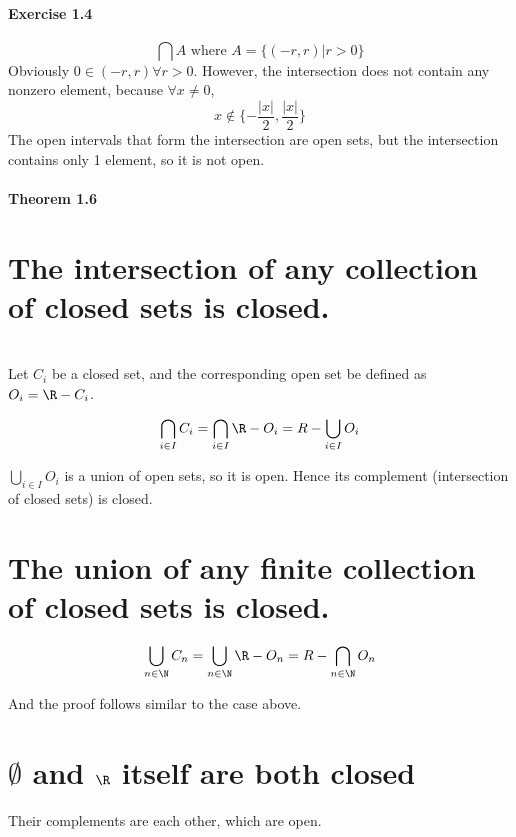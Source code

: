 \subsection{Exercise 1.4}
\setcounter{question}{0}


\begin{solution}
 $$\bigcap A \text{ where } A = \{(-r,r)|r>0\}$$
 Obviously $0 \in (-r,r) \forall r > 0$. However, the intersection does not contain any nonzero element, because $\forall x \neq 0$,
 $$x \notin \{-\frac{|x|}{2},\frac{|x|}{2}\}$$
 The open intervals that form the intersection are open sets, but the intersection contains only 1 element, so it is not open.
\end{solution}

\subsection{Theorem 1.6}
\setcounter{question}{0}

\question

\begin{parts}
 
 \part{The intersection of any collection of closed sets is closed.}
 
 
\begin{solution}
 \\Let $C_i$ be a closed set, and the corresponding open set be defined as $O_i = \R - C_i$.
 
 $$\bigcap_{i \in I} C_i = \bigcap_{i \in I} \R - O_i = R - \bigcup_{i \in I} O_i$$
 
 $\bigcup_{i\in I}O_i$ is a union of open sets, so it is open. Hence its complement (intersection of closed sets) is closed.
\end{solution}

\part{The union of any finite collection of closed sets is closed.}

\begin{solution}
 
 $$\bigcup_{n \in \N} C_n =  \bigcup_{n \in \N} \R - O_n = R - \bigcap_{n \in \N} O_n$$
 
 And the proof follows similar to the case above.
\end{solution}

\part{$\emptyset$ and $\R$ itself are both closed}

\begin{solution}
 Their complements are each other, which are open.
\end{solution}
\end{parts}


